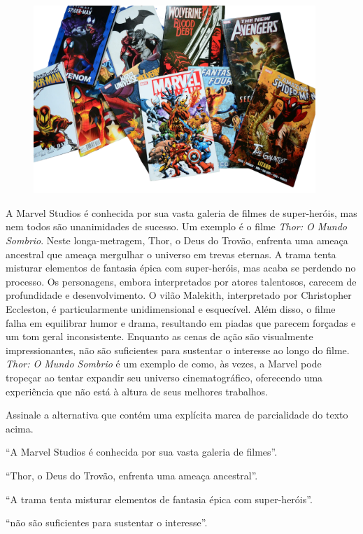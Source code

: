 \begin{myquote}

\begin{figure}[H]
\centering
\includegraphics[width=0.95\textwidth]{./imgSAEB_7_POR/media/image48.png}
\end{figure}

A Marvel Studios é conhecida por sua vasta galeria de filmes de super-heróis,
mas nem todos são unanimidades de sucesso. Um exemplo é o filme \textit{Thor: O Mundo
Sombrio}. Neste longa-metragem, Thor, o Deus do Trovão, enfrenta uma ameaça
ancestral que ameaça mergulhar o universo em trevas eternas. A trama tenta
misturar elementos de fantasia épica com super-heróis, mas acaba se perdendo
no processo. Os personagens, embora interpretados por atores talentosos,
carecem de profundidade e desenvolvimento. O vilão Malekith, interpretado por
Christopher Eccleston, é particularmente unidimensional e esquecível. Além
disso, o filme falha em equilibrar humor e drama, resultando em piadas que
parecem forçadas e um tom geral inconsistente. Enquanto as cenas de ação são
visualmente impressionantes, não são suficientes para sustentar o interesse ao
longo do filme. \textit{Thor: O Mundo Sombrio} é um exemplo de como, às vezes, a
Marvel pode tropeçar ao tentar expandir seu universo cinematográfico,
oferecendo uma experiência que não está à altura de seus melhores trabalhos.

\end{myquote}

Assinale a alternativa que contém uma explícita marca de parcialidade do texto acima.

\begin{escolha}
  
  \item ``A Marvel Studios é conhecida por sua vasta galeria de filmes''.
  
  \item ``Thor, o Deus do Trovão, enfrenta uma ameaça ancestral''.
  
  \item ``A trama tenta misturar elementos de fantasia épica com super-heróis''.
  
  \item ``não são suficientes para sustentar o interesse''.

\end{escolha}

